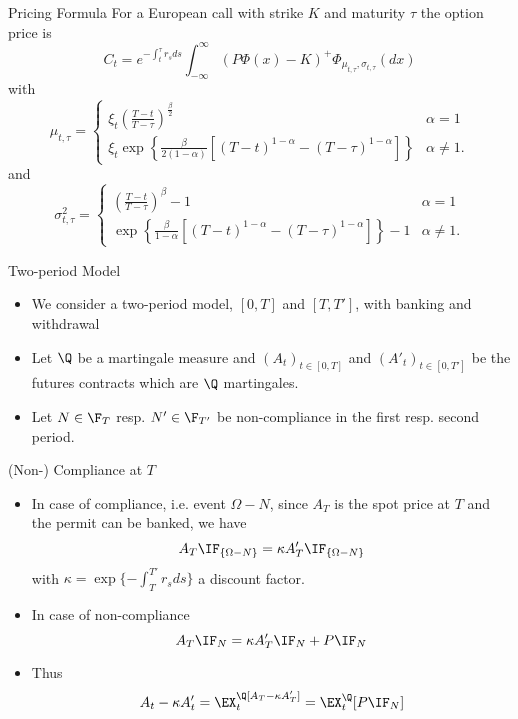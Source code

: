 
{Pricing Formula}
For a European call with strike $K$ and maturity $\tau$ the option price is
$$
C_t = e^{-\int_t^\tau r_s ds} \int_{-\infty}^\infty (P\Phi(x)-K)^+ \Phi_{\mu_{t,\tau}, \sigma_{t,\tau}}(dx)
$$
with
$$
\mu_{t,\tau}=
\left\{
\begin{array}{ll}
\xi_t \left(\frac{T-t}{T-\tau}\right)^{\frac{\beta}{2}} & \alpha =1\\
\xi_t \exp\left\{\frac{\beta}{2(1-\alpha)}[(T-t)^{1-\alpha}-(T-\tau)^{1-\alpha}]\right\} & \alpha \not= 1.
\end{array}
\right.
$$
and
$$
\sigma^2_{t,\tau}=
\left\{
\begin{array}{ll}
\left(\frac{T-t}{T-\tau}\right)^\beta-1 & \alpha =1\\
\exp\left\{\frac{\beta}{1-\alpha}[(T-t)^{1-\alpha}-(T-\tau)^{1-\alpha}]\right\}-1 & \alpha \not= 1.
\end{array}
\right.
$$


{Two-period Model}
\begin{itemize}
\item<1-> We consider a two-period model, $[0,T]$ and $[T,T']$, with banking and withdrawal
\item<2-> Let $\Q$ be a martingale measure and $(A_t)_{t\in[0,T]}$ and $(A'_t)_{t\in[0,T']}$
be the futures contracts which are $\Q$ martingales.
\item<3-> Let $N\in \F_T$ resp. $N' \in \F_{T'}$ be non-compliance in the first resp. second period.
\end{itemize}

{(Non-) Compliance at $T$}
\begin{itemize}
\item<1-> In case of compliance, i.e. event $\Omega-N$, since $A_T$ is the spot price at $T$ and the permit can be banked,  we have
$$
A_T\IF_{\{\Omega-N\}}= \kappa A'_T \IF_{\{\Omega-N\}}
$$
with $\kappa= \exp\{-\int_T^{T'}r_s ds\}$ a discount factor.
\item<2-> In case of non-compliance
$$
A_T\IF_{N}= \kappa A'_T \IF_{N} + P\IF_N
$$
\item<3-> Thus
$$
A_t-\kappa A'_t = \EX_t^\Q[A_T-\kappa A'_T]= \EX^\Q_t[P \IF_N]
$$
\end{itemize}

